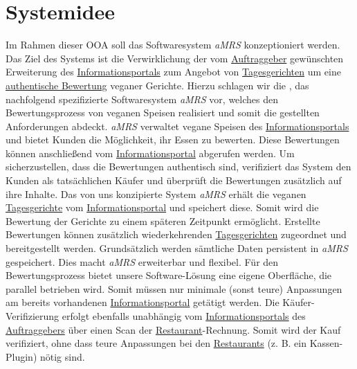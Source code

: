 \section{Systemidee}

Im Rahmen dieser \ac{OOA} soll das Softwaresystem \textit{\ac{aMRS}} konzeptioniert werden.
\newparagraph
Das Ziel des Systems ist die Verwirklichung der vom \hyperref[gls:auftraggeber]{Auftraggeber} gewünschten Erweiterung des \hyperref[gls:informationsportal]{Informationsportals} zum Angebot von \hyperref[gls:tagesgericht]{Tagesgerichten} um eine \hyperref[gls:authentischeBewertung]{authentische Bewertung} veganer Gerichte.
Hierzu schlagen wir die \textit{\vFKW}, das nachfolgend spezifizierte Softwaresystem \textit{\ac{aMRS}} vor, welches den Bewertungsprozess von veganen Speisen realisiert und somit die gestellten Anforderungen abdeckt.
\textit{\ac{aMRS}} verwaltet vegane Speisen des \hyperref[gls:informationsportal]{Informationsportals} und bietet Kunden die Möglichkeit, ihr Essen zu bewerten.
Diese Bewertungen können anschließend vom \hyperref[gls:informationsportal]{Informationsportal} abgerufen werden.
Um sicherzustellen, dass die Bewertungen authentisch sind, verifiziert das System den Kunden als tatsächlichen Käufer und überprüft die Bewertungen zusätzlich auf ihre Inhalte.
\newparagraph
Das von uns konzipierte System \textit{\ac{aMRS}} erhält die veganen \hyperref[gls:tagesgericht]{Tagesgerichte} vom \hyperref[gls:informationsportal]{Informationsportal} und speichert diese.
Somit wird die Bewertung der Gerichte zu einem späteren Zeitpunkt ermöglicht.
Erstellte Bewertungen können zusätzlich wiederkehrenden \hyperref[gls:tagesgericht]{Tagesgerichten} zugeordnet und bereitgestellt werden. Grundsätzlich werden sämtliche Daten persistent in \textit{\ac{aMRS}} gespeichert.
Dies macht \textit{\ac{aMRS}} erweiterbar und flexibel.
\newparagraph
Für den Bewertungsprozess bietet unsere Software-Lösung eine eigene Oberfläche, die parallel betrieben wird.
Somit müssen nur minimale (sonst teure) Anpassungen am bereits vorhandenen \hyperref[gls:informationsportal]{Informationsportal} getätigt werden.
Die Käufer-Verifizierung erfolgt ebenfalls unabhängig vom \hyperref[gls:informationsportal]{Informationsportals} des \hyperref[gls:auftraggeber]{Auftraggebers} über einen Scan der \hyperref[gls:restaurant]{Restaurant}-Rechnung.
Somit wird der Kauf verifiziert, ohne dass teure Anpassungen bei den \hyperref[gls:restaurant]{Restaurants} (z. B. ein Kassen-Plugin) nötig sind.

